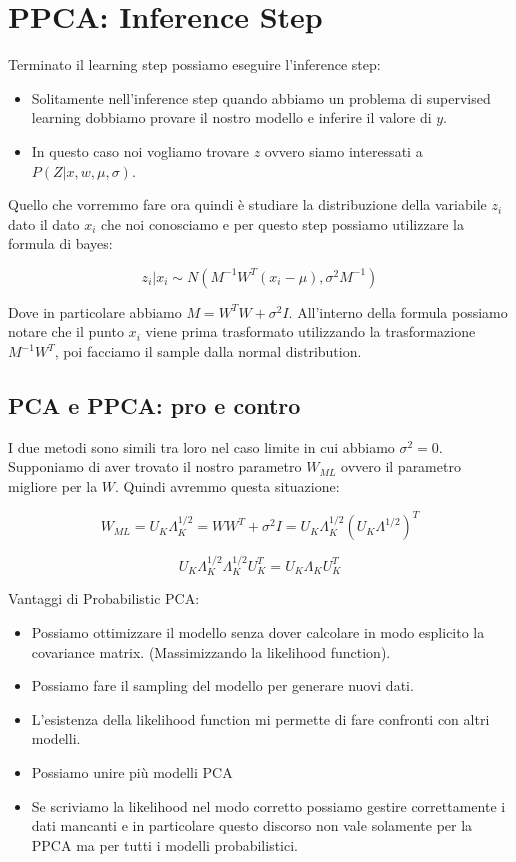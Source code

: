 \documentclass[14pt]{extreport}
\begin{document}
\section{PPCA: Inference Step}

Terminato il learning step possiamo eseguire l'inference step:
\begin{itemize}
	\item Solitamente nell'inference step quando abbiamo un problema di supervised learning dobbiamo provare il nostro modello e inferire il valore di
	$y$.
	\item In questo caso noi vogliamo trovare $z$ ovvero siamo interessati a $P(Z|x, w, \mu, \sigma)$.
\end{itemize}

Quello che vorremmo fare ora quindi è studiare la distribuzione della variabile $z_i$ dato il dato $x_i$ che noi conosciamo e per questo step possiamo
utilizzare la formula di bayes:

$$z_i | x_i \sim N(M^{-1}W^{T}(x_i-\mu), \sigma^2M^{-1})$$

Dove in particolare abbiamo $M = W^TW + \sigma^2I$. All'interno della formula possiamo notare che il punto $x_i$ viene prima trasformato utilizzando
la trasformazione $M^{-1}W^{T}$, poi facciamo il sample dalla normal distribution.

\subsection{PCA e PPCA: pro e contro}

I due metodi sono simili tra loro nel caso limite in cui abbiamo $\sigma^2 = 0$. Supponiamo di aver trovato il nostro parametro $W_{ML}$ ovvero il
parametro migliore per la $W$. Quindi avremmo questa situazione:

$$W_{ML} = U_K\Lambda_K^{1/2} = WW^T + \sigma^2I = U_K\Lambda_K^{1/2}(U_K\Lambda^{1/2})^T$$

$$U_K\Lambda_K^{1/2}\Lambda_K^{1/2}U_{K}^{T} = U_K \Lambda_K U_K^T$$

Vantaggi di Probabilistic PCA:

\begin{itemize}
	\item Possiamo ottimizzare il modello senza dover calcolare in modo esplicito la covariance matrix. (Massimizzando la likelihood function).
	\item Possiamo fare il sampling del modello per generare nuovi dati.
	\item L'esistenza della likelihood function mi permette di fare confronti con altri modelli.
	\item Possiamo unire più modelli PCA
	\item Se scriviamo la likelihood nel modo corretto possiamo gestire correttamente i dati mancanti e in particolare questo discorso non vale
	      solamente per la PPCA ma per tutti i modelli probabilistici.
\end{itemize}
\end{document}
